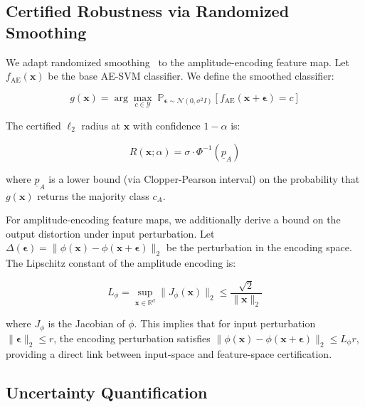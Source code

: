 \documentclass[twocolumn,a4paper,11pt]{article}
\begin{document}
\subsection{Certified Robustness via Randomized Smoothing}

We adapt randomized smoothing~\cite{cohen2019certified} to the amplitude-encoding
feature map. Let $f_{\text{AE}}(\mathbf{x})$ be the base AE-SVM
classifier. We define the smoothed classifier:

\begin{equation}
g(\mathbf{x}) = \arg\max_{c \in \mathcal{Y}} \;
\mathbb{P}_{\boldsymbol{\epsilon} \sim \mathcal{N}(0, \sigma^2 I)}
	\left[f_{\text{AE}}(\mathbf{x} + \boldsymbol{\epsilon}) = c\right]
\label{eq:smoothed}
\end{equation}

The certified $\ell_2$ radius at $\mathbf{x}$ with confidence $1-\alpha$ is:

\begin{equation}
R(\mathbf{x}; \alpha) = \sigma \cdot \Phi^{-1}\!\left(\underline{p}_A\right)
\label{eq:radius}
\end{equation}

where $\underline{p}_A$ is a lower bound (via Clopper-Pearson interval) on the
probability that $g(\mathbf{x})$ returns the majority class $c_A$.

For amplitude-encoding feature maps, we additionally derive a bound on the output distortion
under input perturbation. Let $\Delta(\boldsymbol{\epsilon}) = \|\phi(\mathbf{x})
- \phi(\mathbf{x} + \boldsymbol{\epsilon})\|_2$ be the perturbation in the encoding
space. The Lipschitz constant of the amplitude encoding is:

\begin{equation}
L_\phi = \sup_{\mathbf{x} \in \mathbb{R}^d} \|J_\phi(\mathbf{x})\|_2 \leq
\frac{\sqrt{2}}{\|\mathbf{x}\|_2}
\label{eq:lipschitz}
\end{equation}

where $J_\phi$ is the Jacobian of $\phi$. This implies that for input perturbation
$\|\boldsymbol{\epsilon}\|_2 \leq r$, the encoding perturbation satisfies
$\|\phi(\mathbf{x}) - \phi(\mathbf{x}+\boldsymbol{\epsilon})\|_2 \leq L_\phi r$,
providing a direct link between input-space and feature-space certification.

\subsection{Uncertainty Quantification}
\end{document}

